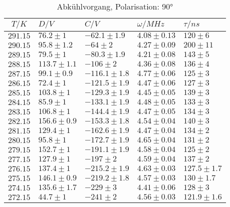 \begin{table}[h!]
\footnotesize\centering
\begin{tabular}{|c|l|l|l|l|}
\hline
$T/K$&$D/V$&$C/V$&$\omega/MHz$&$\tau/ns$\\\hline\hline
$291.15$&$76.2\pm1$&$-62.1\pm1.9$&$4.08\pm0.13$&$120\pm6$\\\hline
$290.15$&$95.8\pm1.2$&$-64\pm2$&$4.27\pm0.09$&$200\pm11$\\\hline
$289.15$&$79.5\pm1$&$-80.3\pm1.9$&$4.21\pm0.08$&$143\pm5$\\\hline
$288.15$&$113.7\pm1.1$&$-106\pm2$&$4.36\pm0.08$&$136\pm4$\\\hline
$287.15$&$99.1\pm0.9$&$-116.1\pm1.8$&$4.77\pm0.06$&$125\pm3$\\\hline
$286.15$&$72.4\pm1$&$-121.5\pm1.9$&$4.47\pm0.06$&$127\pm3$\\\hline
$285.15$&$103.8\pm1$&$-129.3\pm1.9$&$4.45\pm0.05$&$139\pm3$\\\hline
$284.15$&$85.9\pm1$&$-133.1\pm1.9$&$4.48\pm0.05$&$133\pm3$\\\hline
$283.15$&$106.8\pm1$&$-144.4\pm1.9$&$4.47\pm0.05$&$134\pm3$\\\hline
$282.15$&$156.6\pm0.9$&$-153.3\pm1.8$&$4.54\pm0.04$&$140\pm3$\\\hline
$281.15$&$129.4\pm1$&$-162.6\pm1.9$&$4.47\pm0.04$&$134\pm2$\\\hline
$280.15$&$95.8\pm1$&$-172.7\pm1.9$&$4.65\pm0.04$&$131\pm2$\\\hline
$279.15$&$152.7\pm1$&$-191.1\pm1.9$&$4.58\pm0.04$&$125\pm2$\\\hline
$277.15$&$127.9\pm1$&$-197\pm2$&$4.59\pm0.04$&$137\pm2$\\\hline
$276.15$&$137.4\pm1$&$-215.2\pm1.9$&$4.63\pm0.03$&$127.5\pm1.7$\\\hline
$275.15$&$146.1\pm0.9$&$-219.2\pm1.8$&$4.57\pm0.03$&$130\pm1.7$\\\hline
$274.15$&$135.6\pm1.7$&$-229\pm3$&$4.41\pm0.06$&$128\pm3$\\\hline
$272.15$&$44.7\pm1$&$-241\pm2$&$4.56\pm0.03$&$121.9\pm1.6$\\\hline
\end{tabular}
\caption{Abkühlvorgang, Polarisation: 90°\label{cold90}}
\end{table}
